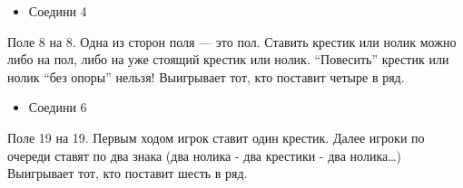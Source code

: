 \documentclass[]{article}
\begin{document}
\begin{itemize}
\itemsep1pt\parskip0pt
\item
  Соедини 4
\end{itemize}

Поле 8 на 8. Одна из сторон поля --- это пол. Ставить крестик или нолик
можно либо на пол, либо на уже стоящий крестик или нолик. ``Повесить''
крестик или нолик ``без опоры'' нельзя! Выигрывает тот, кто поставит
четыре в ряд.

\begin{itemize}
\itemsep1pt\parskip0pt
\item
  Соедини 6
\end{itemize}

Поле 19 на 19. Первым ходом игрок ставит один крестик. Далее игроки по
очереди ставят по два знака (два нолика - два крестики - два
нолика\ldots{}) Выигрывает тот, кто поставит шесть в ряд.
\end{document}
